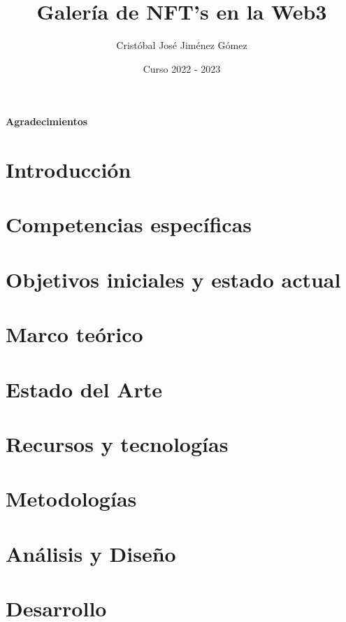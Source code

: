 \documentclass[oneside,12pt]{book}
\title{Galería de NFT's en la Web3}
\author{Cristóbal José Jiménez Gómez}
\date{Curso 2022 - 2023}
\begin{document}


%

\newpage
{}
{\Large{\textbf{Agradecimientos}}}


\clearpage

\tableofcontents
\newpage
\listoffigures
\newpage
\listoftables

\clearpage
{}

\chapter{Introducción}

\newpage
\chapter{Competencias específicas}

\newpage
\chapter{Objetivos iniciales y estado actual}

\newpage
\chapter{Marco teórico}

\newpage

\chapter{Estado del Arte}

\newpage
\chapter{Recursos y tecnologías}
\newpage
\chapter{Metodologías}
\newpage
\chapter{Análisis y Diseño}
\newpage
\chapter{Desarrollo}
\newpage
\end{document}
